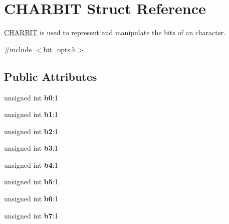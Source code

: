 \hypertarget{struct_c_h_a_r_b_i_t}{\section{C\-H\-A\-R\-B\-I\-T Struct Reference}
\label{struct_c_h_a_r_b_i_t}
}


\hyperlink{struct_c_h_a_r_b_i_t}{C\-H\-A\-R\-B\-I\-T} is used to represent and manipulate the bits of an character.  




{\ttfamily \#include $<$bit\-\_\-opts.\-h$>$}

\subsection*{Public Attributes}
\begin{DoxyCompactItemize}
\item 
\hypertarget{struct_c_h_a_r_b_i_t_a1c20a16fb38447972f401d906a705c63}{unsigned int {\bfseries b0}\-:1}\label{struct_c_h_a_r_b_i_t_a1c20a16fb38447972f401d906a705c63}

\item 
\hypertarget{struct_c_h_a_r_b_i_t_adc6dd997a807e34f946c93fb5aaf89ec}{unsigned int {\bfseries b1}\-:1}\label{struct_c_h_a_r_b_i_t_adc6dd997a807e34f946c93fb5aaf89ec}

\item 
\hypertarget{struct_c_h_a_r_b_i_t_a505bc11cac1a1e5123c32245265fb63d}{unsigned int {\bfseries b2}\-:1}\label{struct_c_h_a_r_b_i_t_a505bc11cac1a1e5123c32245265fb63d}

\item 
\hypertarget{struct_c_h_a_r_b_i_t_a51ffc349a964acf4447ffe5d883909d2}{unsigned int {\bfseries b3}\-:1}\label{struct_c_h_a_r_b_i_t_a51ffc349a964acf4447ffe5d883909d2}

\item 
\hypertarget{struct_c_h_a_r_b_i_t_aa107fb7b3899fa4c6479facbf453bc04}{unsigned int {\bfseries b4}\-:1}\label{struct_c_h_a_r_b_i_t_aa107fb7b3899fa4c6479facbf453bc04}

\item 
\hypertarget{struct_c_h_a_r_b_i_t_a93850d2bb43e78344d4e77a484ba6cbe}{unsigned int {\bfseries b5}\-:1}\label{struct_c_h_a_r_b_i_t_a93850d2bb43e78344d4e77a484ba6cbe}

\item 
\hypertarget{struct_c_h_a_r_b_i_t_a7d9c16b3cc8744382a6ae20cdaa073c2}{unsigned int {\bfseries b6}\-:1}\label{struct_c_h_a_r_b_i_t_a7d9c16b3cc8744382a6ae20cdaa073c2}

\item 
\hypertarget{struct_c_h_a_r_b_i_t_a830069873549cfe3c7dc6ca7262db049}{unsigned int {\bfseries b7}\-:1}\label{struct_c_h_a_r_b_i_t_a830069873549cfe3c7dc6ca7262db049}

\end{DoxyCompactItemize}


